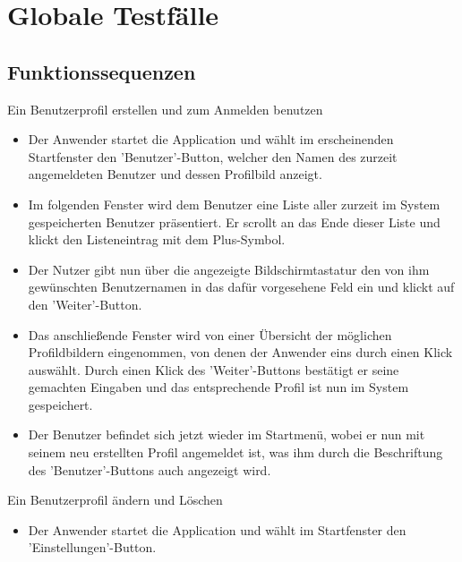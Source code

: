 

\chapter{Globale Testfälle}

\section{Funktionssequenzen}

\begin{requirements}

	 Ein Benutzerprofil erstellen und zum Anmelden benutzen
	
	\begin{itemize}
  			\item Der Anwender startet die Application und wählt im erscheinenden Startfenster den 'Benutzer'-Button, welcher den Namen des zurzeit angemeldeten Benutzer und dessen Profilbild anzeigt.
  			
  			\item Im folgenden Fenster wird dem Benutzer eine Liste aller zurzeit im System gespeicherten Benutzer präsentiert. Er scrollt an das Ende dieser Liste und klickt den Listeneintrag mit dem Plus-Symbol.
  			
  			\item Der Nutzer gibt nun über die angezeigte Bildschirmtastatur den von ihm gewünschten Benutzernamen in das dafür vorgesehene Feld ein und klickt auf den 'Weiter'-Button. 
  			
  			\item Das anschließende Fenster wird von einer Übersicht der möglichen Profildbildern eingenommen, von denen der Anwender eins durch einen Klick auswählt. Durch einen Klick des 'Weiter'-Buttons bestätigt er seine gemachten Eingaben und das entsprechende Profil ist nun im System gespeichert. 
  			
  			\item Der Benutzer befindet sich jetzt wieder im Startmenü, wobei er nun mit seinem neu erstellten Profil angemeldet ist, was ihm durch die Beschriftung des 'Benutzer'-Buttons auch angezeigt wird.

  			
	\end{itemize}
	
	
	 Ein Benutzerprofil ändern und Löschen 
	
	\begin{itemize}
  			\item Der Anwender startet die Application und wählt im  Startfenster den 'Einstellungen'-Button.
  			

\end{itemize}
\end{requirements}
